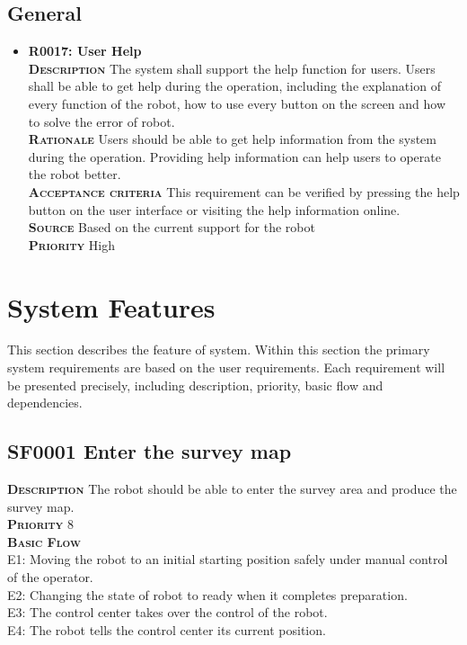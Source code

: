 \documentclass[11pt, a4paper]{article}
\begin{document}
\subsection{General}
\begin{itemize}
\item {\bfseries R0017: User Help} \\
\textsc{\bfseries Description} The system shall support the help function for users. Users shall be able to get help during the operation, including the explanation of every function of the robot, how to use every button on the screen and how to solve the error of robot.\\
\textsc{\bfseries Rationale} Users should be able to get help information from the system during the operation. Providing help information can help users to operate the robot better.\\
\textsc{\bfseries Acceptance criteria} This requirement can be verified by pressing the help button on the user interface or visiting the help information online.\\
\textsc{\bfseries Source} Based on the current support for the robot\\
\textsc{\bfseries Priority} High\\
\end{itemize}

\section{System Features}
This section describes the feature of system. Within this section the primary system requirements are based on the user requirements. Each requirement will be presented precisely, including description,  priority, basic flow and dependencies. 
\subsection{SF0001 Enter the survey map}
\textsc{\bfseries Description} The robot should be able to enter the survey area and produce the survey map.\\
\textsc{\bfseries Priority} 8\\
\textsc{\bfseries Basic Flow} \\
\textsc{E1:} Moving the robot to an initial starting position safely under manual control of the operator.\\
\textsc{E2:} Changing the state of robot to ready when it completes preparation.\\
\textsc{E3:} The control center takes over the control of the robot.\\
\textsc{E4:} The robot tells the control center its current position.\\
\end{document}
